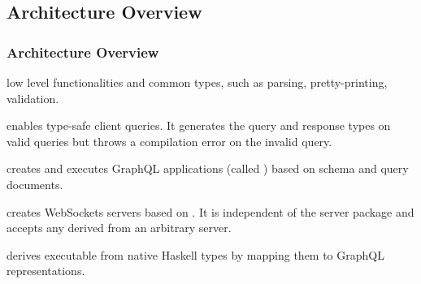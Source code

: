 \subsection{Architecture Overview}

\begin{frame}[allowframebreaks]\frametitle{Architecture Overview}

\begin{enumerate} 

  \footnotesize
  
   low level functionalities and common types, such as  parsing, pretty-printing, validation.

   enables type-safe client queries. It generates the query and response types on valid queries but throws a compilation error on the invalid query.

   creates and executes GraphQL applications (called ) based on schema and query documents.
  
    creates WebSockets servers based on . It is independent of the server package and accepts any  derived from an arbitrary server.

   derives executable  from native Haskell types by mapping them to GraphQL representations. 

\end{enumerate}


\end{frame}
